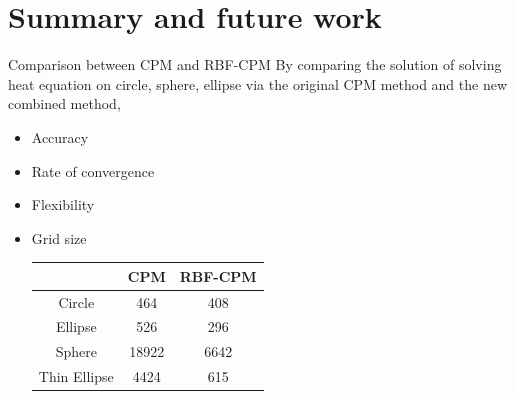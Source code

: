 \documentclass{beamer}
\begin{document}
\section{Summary and future work}

\begin{frame}{Comparison between CPM and RBF-CPM}
    By comparing the solution of solving heat equation on circle, sphere, ellipse via the original CPM method and the new combined method,
    \begin{itemize}
        \item <1-> Accuracy
        \item <2-> Rate of convergence
        \item <3-> Flexibility
        \item <4-> Grid size
                    \begin{table}[]
                        \centering
                        \begin{tabular}{c|c|c}
                              &  CPM & RBF-CPM\\
                             \hline \hline
                            Circle & 464 & 408\\
                            Ellipse & 526 & 296\\
                            Sphere & 18922 & 6642\\
                            Thin Ellipse & 4424 & 615\\
                        \end{tabular}
                    \end{table}
    \end{itemize}
\end{frame}
\end{document}
